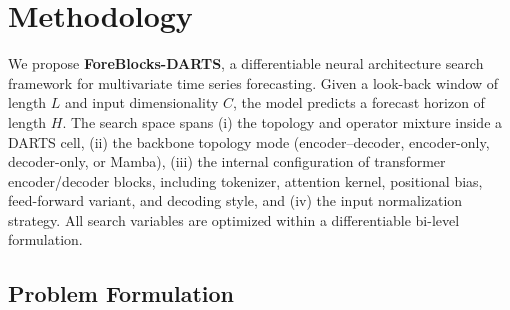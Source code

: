 
\section{Methodology}
\label{sec:methodology}

We propose \textbf{ForeBlocks-DARTS}, a differentiable neural architecture
search framework for multivariate time series forecasting. Given a look-back
window of length $L$ and input dimensionality $C$, the model predicts a
forecast horizon of length $H$. The search space spans (i) the topology and
operator mixture inside a DARTS cell, (ii) the backbone topology mode
(encoder--decoder, encoder-only, decoder-only, or Mamba), (iii) the internal
configuration of transformer encoder/decoder blocks, including tokenizer,
attention kernel, positional bias, feed-forward variant, and decoding style,
and (iv) the input normalization strategy. All search variables are optimized
within a differentiable bi-level formulation.

\subsection{Problem Formulation}
\label{sec:problem}

